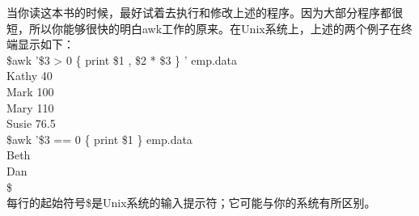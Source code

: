 \documentclass[10pt,fancyhdr,UTF-8]{ctexart}
\begin{document}
当你读这本书的时候，最好试着去执行和修改上述的程序。因为大部分程序都很短，所以你能够很快的明白awk工作的原来。在Unix系统上，上述的两个例子在终端显示如下：\\
\$awk  '\$3 > 0 \{ print \$1 , \$2 * \$3  \} ' emp.data\\
\indent Kathy   40 \\
\indent Mark    100 \\
\indent Mary    110 \\
\indent Susie  76.5 \\
\indent \$awk '\$3 == 0 \{ print \$1  \} emp.data \\
\indent Beth \\
\indent Dan  \\
\indent \$   \\
\indent 每行的起始符号\$是Unix系统的输入提示符；它可能与你的系统有所区别。 \\
\end{document}
